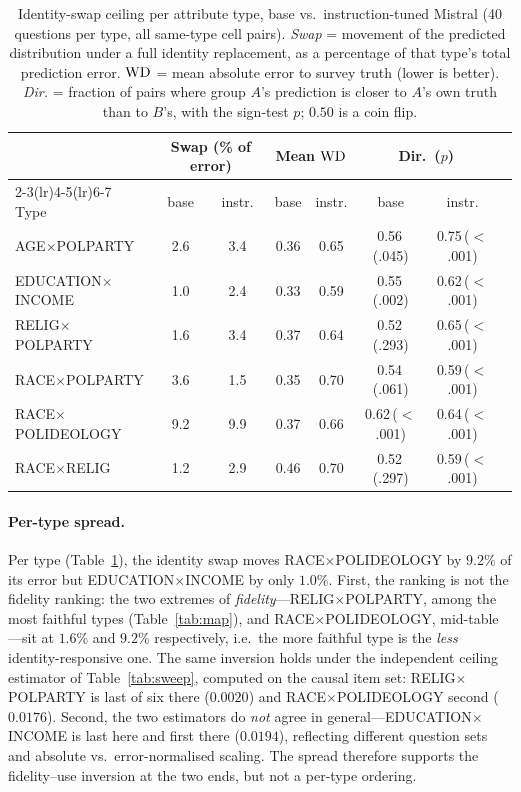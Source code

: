 \begin{table}[t]
\centering\small
\setlength{\tabcolsep}{5pt}
\caption{Identity-swap ceiling per attribute type, base vs.\
instruction-tuned Mistral (40 questions per type, all same-type cell
pairs). \emph{Swap} = movement of the predicted distribution under a full
identity replacement, as a percentage of that type's total prediction
error. $\mathrm{WD}$ = mean absolute error to survey truth (lower is better).
\emph{Dir.} = fraction of pairs where group $A$'s prediction is closer to
$A$'s own truth than to $B$'s, with the sign-test $p$; $0.50$ is a coin
flip.}
\label{tab:ceiling}
\begin{tabular}{lccccccc}
\toprule
& \multicolumn{2}{c}{Swap (\% of error)} & \multicolumn{2}{c}{Mean $\mathrm{WD}$}
& \multicolumn{2}{c}{Dir.\ ($p$)}\\
\cmidrule(lr){2-3}\cmidrule(lr){4-5}\cmidrule(lr){6-7}
Type & base & instr. & base & instr. & base & instr.\\
\midrule
AGE$\times$POLPARTY & 2.6 & 3.4 & 0.36 & 0.65 & 0.56\,(.045) & 0.75\,($<$.001) \\
EDUCATION$\times$INCOME & 1.0 & 2.4 & 0.33 & 0.59 & 0.55\,(.002) & 0.62\,($<$.001) \\
RELIG$\times$POLPARTY & 1.6 & 3.4 & 0.37 & 0.64 & 0.52\,(.293) & 0.65\,($<$.001) \\
RACE$\times$POLPARTY & 3.6 & 1.5 & 0.35 & 0.70 & 0.54\,(.061) & 0.59\,($<$.001) \\
RACE$\times$POLIDEOLOGY & 9.2 & 9.9 & 0.37 & 0.66 & 0.62\,($<$.001) & 0.64\,($<$.001) \\
RACE$\times$RELIG & 1.2 & 2.9 & 0.46 & 0.70 & 0.52\,(.297) & 0.59\,($<$.001) \\
\bottomrule
\end{tabular}
\end{table}

\paragraph{Per-type spread.}
\label{app:ceiling-spread}
Per type (Table~\ref{tab:ceiling}), the identity swap moves
RACE$\times$POLIDEOLOGY by $9.2\%$ of its error but
EDUCATION$\times$INCOME by only $1.0\%$. First, the ranking is not the
fidelity ranking: the two extremes
of \emph{fidelity}---RELIG$\times$POLPARTY, among the most faithful types
(Table~\ref{tab:map}), and RACE$\times$POLIDEOLOGY, mid-table---sit at
$1.6\%$ and $9.2\%$ respectively, i.e.\ the more faithful type is the
\emph{less} identity-responsive one. The same inversion holds under the
independent ceiling estimator of Table~\ref{tab:sweep}, computed on the
causal item set: RELIG$\times$POLPARTY is last of six there ($0.0020$)
and RACE$\times$POLIDEOLOGY second ($0.0176$). Second, the two estimators
do \emph{not} agree in general---EDUCATION$\times$INCOME is last here and
first there ($0.0194$), reflecting different question sets and absolute
vs.\ error-normalised scaling. The spread therefore supports the
fidelity--use inversion at the two ends, but not a per-type ordering.

